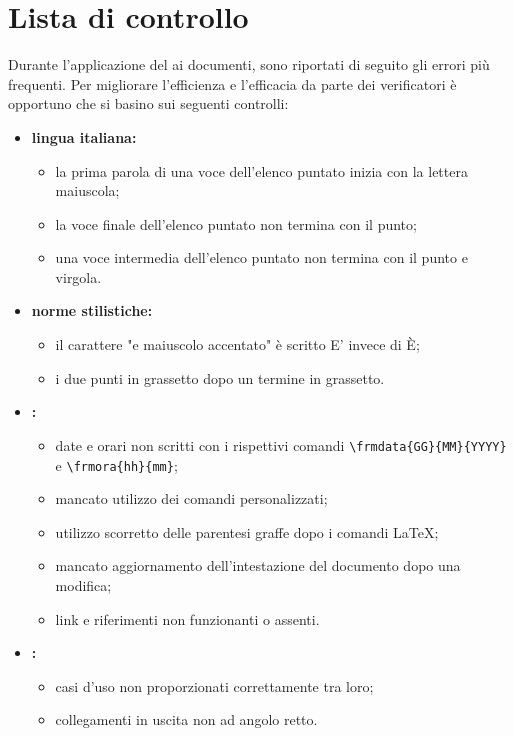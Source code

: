 \section{Lista di controllo}
Durante l'applicazione del  ai documenti, sono riportati di seguito gli errori più frequenti. Per migliorare l'efficienza e l'efficacia da parte dei verificatori è opportuno che si basino sui seguenti controlli:
	\begin{itemize}
		\item \textbf{lingua italiana:}
		\begin{itemize}
			\item la prima parola di una voce dell'elenco puntato inizia con la lettera maiuscola;
			\item la voce finale dell'elenco puntato non termina con il punto;
			\item una voce intermedia dell'elenco puntato non termina con il punto e virgola.
		\end{itemize}
		\item \textbf{norme stilistiche:}
		\begin{itemize}
			\item il carattere "e maiuscolo accentato" è scritto E' invece di È;
			\item i due punti in grassetto dopo un termine in grassetto.
		\end{itemize}
		\item \textbf{:}
		\begin{itemize}
			\item date e orari non scritti con i rispettivi comandi \texttt{\textbackslash frmdata\{GG\}\{MM\}\{YYYY\}} e \texttt{\textbackslash frmora\{hh\}\{mm\}};
			\item mancato utilizzo dei comandi personalizzati;
			\item utilizzo scorretto delle parentesi graffe dopo i comandi \LaTeX;
			\item mancato aggiornamento dell'intestazione del documento dopo una modifica;
			\item link e riferimenti non funzionanti o assenti.
		\end{itemize}
		\item \textbf{:}
		\begin{itemize}
			\item casi d'uso non proporzionati correttamente tra loro;
			\item collegamenti in uscita non ad angolo retto.
		\end{itemize}

\end{itemize}
